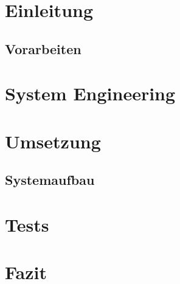 \documentclass{report}
\begin{document}
\section{Einleitung}

\subsection{Vorarbeiten}\label{vorarbeiten}

\section{System Engineering}

\vspace{-4mm}

\section{Umsetzung}
%
\subsection{Systemaufbau}
%
\section{Tests}
%
\section{Fazit}
%

\newpage
\setlength{\cftbeforelottitleskip}{0pt} %
\setlength{\cftafterlottitleskip}{15pt} %
\listoftables
{}  %

\renewcommand{\bibname}{Quellenverzeichnis}
\printbibliography[title={Quellenverzeichnis}]

\appendix

\end{document}

